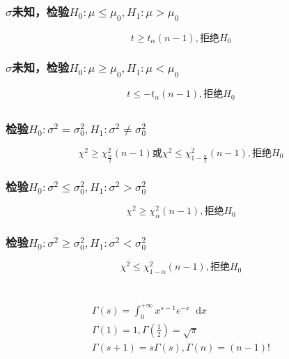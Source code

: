 \documentclass[]{article}
\newcommand*{\dif}{\mathop{}\!\mathrm{d}}
\numberwithin{equation}{section}
\begin{document}
\subsubsection{$\sigma$未知，检验$H_0:\mu\le\mu_0,H_1:\mu>\mu_0$}
\begin{equation}
    t\ge t_\alpha(n-1),\text{拒绝}H_0
\end{equation}
\subsubsection{$\sigma$未知，检验$H_0:\mu\ge\mu_0,H_1:\mu<\mu_0$}
\begin{equation}
    t\le -t_\alpha(n-1),\text{拒绝}H_0
\end{equation}
\subsection{}
\subsubsection{检验$H_0:\sigma^2=\sigma_0^2,H_1:\sigma^2\ne\sigma_0^2$}
\begin{equation}
    \chi^2\ge\chi_\frac{\alpha}{2}^2(n-1)\text{或}\chi^2\le\chi_{1-\frac{\alpha}{2}}^2(n-1),\text{拒绝}H_0
\end{equation}
\subsubsection{检验$H_0:\sigma^2\le\sigma_0^2,H_1:\sigma^2>\sigma_0^2$}
\begin{equation}
    \chi^2\ge\chi_\alpha^2(n-1),\text{拒绝}H_0
\end{equation}
\subsubsection{检验$H_0:\sigma^2\ge\sigma_0^2,H_1:\sigma^2<\sigma_0^2$}
\begin{equation}
    \chi^2\le\chi_{1-\alpha}^2(n-1),\text{拒绝}H_0
\end{equation}

\section{}
\begin{equation}
    \begin{aligned}
        \Gamma(s)=\int_0^{+\infty}x^{s-1}e^{-x}\dif x \\
        \Gamma(1)=1,\Gamma(\frac1 2)=\sqrt \pi        \\
        \Gamma(s+1)=s\Gamma(s),\Gamma(n)=(n-1)!
    \end{aligned}
\end{equation}
\end{document}
